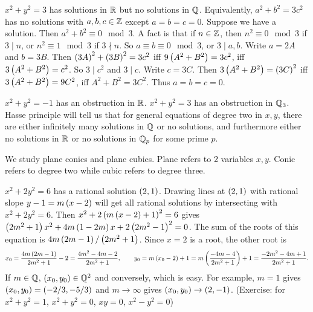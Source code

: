 \begin{example*}
$ x^2 + y^2 = 3 $ has solutions in $ \mathbb{R} $ but no solutions in $ \mathbb{Q} $. Equivalently, $ a^2 + b^2 = 3c^2 $ has no solutions with $ a, b, c \in \mathbb{Z} $ except $ a = b = c = 0 $. Suppose we have a solution. Then $ a^2 + b^2 \equiv 0 \mod 3 $. A fact is that if $ n \in \mathbb{Z} $, then $ n^2 \equiv 0 \mod 3 $ if $ 3 \mid n $, or $ n^2 \equiv 1 \mod 3 $ if $ 3 \nmid n $. So $ a \equiv b \equiv 0 \mod 3 $, or $ 3 \mid a, b $. Write $ a = 2A $ and $ b = 3B $. Then $ \left( 3A \right)^2 + \left( 3B \right)^2 = 3c^2 $ iff $ 9\left( A^2 + B^2 \right) = 3c^2 $, iff $ 3\left( A^2 + B^2 \right) = c^2 $. So $ 3 \mid c^2 $ and $ 3 \mid c $. Write $ c = 3C $. Then $ 3\left( A^2 + B^2 \right) = \left( 3C \right)^2 $ iff $ 3\left( A^2 + B^2 \right) = 9C^2 $, iff $ A^2 + B^2 = 3C^2 $. Thus $ a = b = c = 0 $.
\end{example*}

$ x^2 + y^2 = -1 $ has an obstruction in $ \mathbb{R} $. $ x^2 + y^2 = 3 $ has an obstruction in $ \mathbb{Q}_3 $. Hasse principle will tell us that for general equations of degree two in $ x, y $, there are either infinitely many solutions in $ \mathbb{Q} $ or no solutions, and furthermore either no solutions in $ \mathbb{R} $ or no solutions in $ \mathbb{Q}_p $ for some prime $ p $.


We study plane conics and plane cubics. Plane refers to 2 variables $ x, y $. Conic refers to degree two while cubic refers to degree three.

\begin{example*}
$ x^2 + 2y^2 = 6 $ has a rational solution $ \left( 2, 1 \right) $. Drawing lines at $ \left( 2, 1 \right) $ with rational slope $ y - 1 = m\left( x - 2 \right) $ will get all rational solutions by intersecting with $ x^2 + 2y^2 = 6 $. Then $ x^2 + 2\left( m\left( x - 2 \right) + 1 \right)^2 = 6 $ gives $ \left( 2m^2 + 1 \right)x^2 + 4m\left( 1 - 2m \right)x + 2\left( 2m^2 - 1 \right)^2 = 0 $. The sum of the roots of this equation is $ 4m\left( 2m - 1 \right) / \left( 2m^2 + 1 \right) $. Since $ x = 2 $ is a root, the other root is
$$ x_0 = \dfrac{4m\left( 2m - 1 \right)}{2m^2 + 1} - 2 = \dfrac{4m^2 - 4m - 2}{2m^2 + 1}, \qquad y_0 = m\left( x_0 - 2 \right) + 1 = m\left( \dfrac{-4m - 4}{2m^2 + 1} \right) + 1 = \dfrac{-2m^2 - 4m + 1}{2m^2 + 1}. $$
If $ m \in \mathbb{Q} $, $ \left( x_0, y_0 \right) \in \mathbb{Q}^2 $ and conversely, which is easy. For example, $ m = 1 $ gives $ \left( x_0, y_0 \right) = \left( -2 / 3, -5 / 3 \right) $ and $ m \to \infty $ gives $ \left( x_0, y_0 \right) \to \left( 2, -1 \right) $. (Exercise: for $ x^2 + y^2 = 1 $, $ x^2 + y^2 = 0 $, $ xy = 0 $, $ x^2 - y^2 = 0 $)
\end{example*}

\pagebreak


